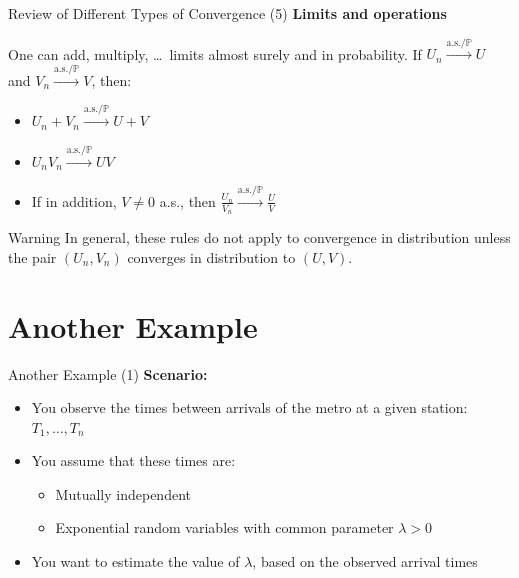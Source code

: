 \documentclass[aspectratio=169]{beamer}
\begin{document}
\begin{frame}{Review of Different Types of Convergence (5)}
\textbf{Limits and operations}

\vspace{0.3cm}

One can add, multiply, \dots\ limits almost surely and in probability. If $U_n \xrightarrow{\text{a.s.}/\mathbb{P}} U$ and $V_n \xrightarrow{\text{a.s.}/\mathbb{P}} V$, then:
\begin{itemize}
    \item $U_n + V_n \xrightarrow{\text{a.s.}/\mathbb{P}} U + V$
    \item $U_nV_n \xrightarrow{\text{a.s.}/\mathbb{P}} UV$
    \item If in addition, $V \neq 0$ a.s., then $\frac{U_n}{V_n} \xrightarrow{\text{a.s.}/\mathbb{P}} \frac{U}{V}$
\end{itemize}

\vspace{0.3cm}

\begin{alertblock}{Warning}
In general, these rules do not apply to convergence in distribution unless the pair $(U_n, V_n)$ converges in distribution to $(U, V)$.
\end{alertblock}
\end{frame}

\section{Another Example}

\begin{frame}{Another Example (1)}
\textbf{Scenario:}
\begin{itemize}
    \item You observe the times between arrivals of the metro at a given station: $T_1, \ldots, T_n$
    \item You assume that these times are:
    \begin{itemize}
        \item Mutually independent
        \item Exponential random variables with common parameter $\lambda > 0$
    \end{itemize}
    \item You want to estimate the value of $\lambda$, based on the observed arrival times
\end{itemize}
\end{frame}
\end{document}
